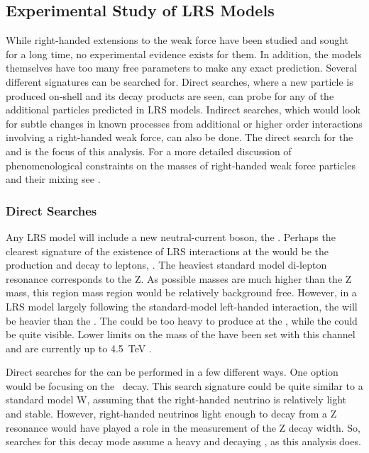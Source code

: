 \subsection{Experimental Study of LRS Models}

While right-handed extensions to the weak force have been studied and sought for a long time, no experimental evidence exists for them.  In addition, the models themselves have too many free parameters to make any exact prediction.  Several different signatures can be searched for.  Direct searches, where a new particle is produced on-shell and its decay products are seen, can probe for any of the additional particles predicted in LRS models.  Indirect searches, which would look for subtle changes in known processes from additional or higher order interactions involving a right-handed weak force, can also be done. The direct search for the \WR and \NR is the focus of this analysis. 
For a more detailed discussion of phenomenological constraints on the masses of right-handed weak force particles and their mixing see \cite{WRphenomLimits}.


\subsubsection{Direct Searches}
Any LRS model will include a new neutral-current boson, the \Zprime.  Perhaps the clearest signature of the existence of LRS interactions at the \LHC would be the \Zprime production and decay to leptons, \ZPtoLL. The heaviest standard model di-lepton resonance corresponds to the Z. As possible \Zprime masses are much higher than the Z mass, this region mass region would be relatively background free.  However, in a LRS model largely following the standard-model left-handed interaction, the \Zprime will be heavier than the \WR.  The \Zprime could be too heavy to produce at the \LHC, while the \WR could be quite visible.  Lower limits on the mass of the \Zprime have been set with this channel and are currently up to \SI{4.5}{\TeV} \cite{Zprime13TeVCMS}.

Direct searches for the \WR can be performed in a few different ways. One option would be focusing on the \WRtoLN\ decay. This search signature could be quite similar to a standard model W, assuming that the right-handed neutrino is relatively light and stable. However, right-handed neutrinos light enough to decay from a Z resonance would have played a role in the measurement of the Z decay width. So, searches for this decay mode assume a heavy and decaying \NR, as this analysis does. 

